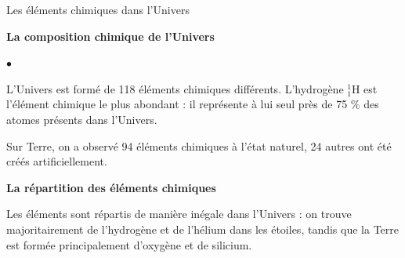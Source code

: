 \documentclass[24pt]{article}
\begin{document}
\begin{concept}{Les éléments chimiques dans l’Univers}
    \begin{minipage}[c]{0.5\textwidth}
        \begin{center}
            \textbf{La composition chimique de l’Univers}
        \end{center}
        \begin{list}{$\bullet$}{}
            \item L’Univers est formé de 118 éléments chimiques différents.
                  L’hydrogène $_1^1$H est l’élément chimique le plus abondant :
                  il représente à lui seul près de 75 \%
                  des atomes présents dans l’Univers.

            \item Sur Terre, on a observé 94 éléments chimiques
                  à l’état naturel, 24 autres ont été créés artificiellement.

        \end{list}
    \end{minipage}
    \hspace{0.05\textwidth}
    \begin{minipage}[c]{0.4\textwidth}
        \begin{center}
            \textbf{La répartition des éléments chimiques}
        \end{center}

        Les éléments sont répartis de manière inégale dans l’Univers :
        on trouve majoritairement de
        l’hydrogène et de l’hélium dans les étoiles, tandis que la Terre
        est formée principalement d’oxygène et de silicium.

    \end{minipage}
\end{concept}
\end{document}
